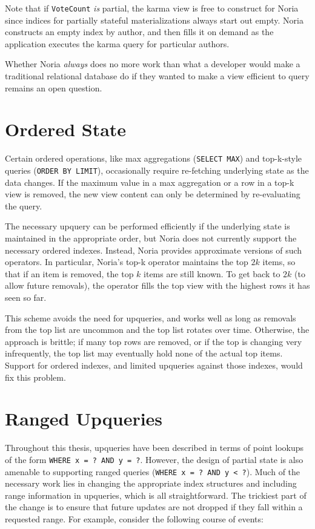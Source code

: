 Note that if \texttt{VoteCount} \emph{is} partial, the karma view is free to
construct for Noria since indices for partially stateful materializations always
start out empty. Noria constructs an empty index by author, and then fills it on
demand as the application executes the karma query for particular authors.

Whether Noria \emph{always} does no more work than what a developer would
make a traditional relational database do if they wanted to make a view
efficient to query remains an open question.

\section{Ordered State}
\label{s:disc:ordered}

Certain ordered operations, like max aggregations (\texttt{SELECT MAX}) and
top-k-style queries (\texttt{ORDER BY LIMIT}), occasionally require re-fetching
underlying state as the data changes. If the maximum value in a max aggregation
or a row in a top-k view is removed, the new view content can only be determined
by re-evaluating the query.

The necessary upquery can be performed efficiently if the underlying state is
maintained in the appropriate order, but Noria does not currently support the
necessary ordered indexes. Instead, Noria provides approximate versions of such
operators. In particular, Noria's top-k operator maintains the top $2k$ items,
so that if an item is removed, the top $k$ items are still known. To get back to
$2k$ (to allow future removals), the operator fills the top view with the
highest rows it has seen so far.

This scheme avoids the need for upqueries, and works well as long as removals
from the top list are uncommon and the top list rotates over time. Otherwise,
the approach is brittle; if many top rows are removed, or if the top is changing
very infrequently, the top list may eventually hold none of the actual top
items. Support for ordered indexes, and limited upqueries against those indexes,
would fix this problem.

\section{Ranged Upqueries}
\label{s:disc:ranged}

Throughout this thesis, upqueries have been described in terms of point lookups
of the form \texttt{WHERE x = ? AND y = ?}. However, the design of partial state
is also amenable to supporting ranged queries (\texttt{WHERE x = ? AND y < ?}).
Much of the necessary work lies in changing the appropriate index structures and
including range information in upqueries, which is all straightforward. The
trickiest part of the change is to ensure that future updates are not dropped if
they fall within a requested range. For example, consider the following course
of events:

